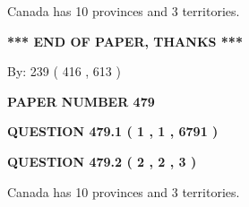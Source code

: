 \documentclass[12pt]{article}
\begin{document}
  
 
 
\noindent{}
 
 
Canada has 10  provinces and 3 territories.
 
 
 
 
   
   
 \vspace{0.2in}
 
   
   
   
   
\vspace{1.0in} 
{\textbf{\large{ *** END OF PAPER, THANKS *** }}} 
   
   
\hspace{1.0in} By: 
 239 ( 416 ,  613 )
   
   
   
   
\newpage 
\setcounter{page}{ 
   479001 } 
   
   
   
   
 {\textbf{ \Large{ PAPER NUMBER  479  }}}
   
   
\vspace{0.2in}
   
   
   
   
   
   
 \vspace{0.2in}
 
 
 
 
   
   
  
\vspace{0.2in}
  
{\textbf{\Large{QUESTION
479.1 
 ( 1 , 1 , 6791 )
}}}
  
  
  
\vspace{0.2in}
  
{\textbf{\Large{QUESTION
479.2 
 ( 2 , 2 , 3 )
}}}
  
  
 
 
\noindent{}
 
 
Canada has 10  provinces and 3 territories.
 
 
 
 
   
   
 \vspace{0.2in}
 
\end{document}
